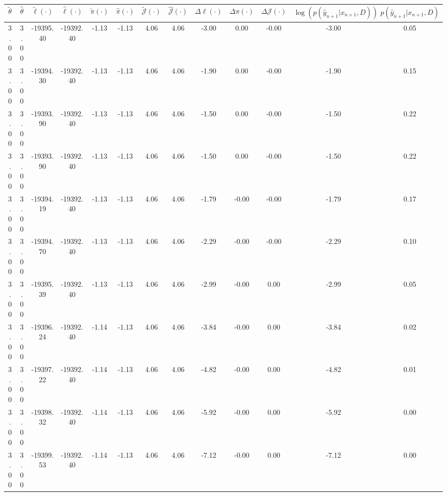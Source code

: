 \begin{table}[htbp]
        \centering
        \tiny
        \begin{adjustbox}{angle=90}
            \begin{tabular}{|c|c|c|c|c|c|c|c|c|c|c|c|c|}
                \hline
                 $\tilde{\theta}$ & $\hat{\theta}$ & $\tilde{\ell}(\cdot)$ & $\hat{\ell}(\cdot)$ & $\tilde{\pi}(\cdot)$ & $\hat{\pi}(\cdot)$ & $\tilde{\mathcal{J}}(\cdot)$ & $\hat{\mathcal{J}}(\cdot)$ & $\Delta \ell(\cdot)$ & $\Delta \pi(\cdot)$ & $\Delta \mathcal{J}(\cdot)$ & $\log(p(\hat{y}_{n+1}|x_{n+1}, D))$ & $p(\hat{y}_{n+1}|x_{n+1}, D)$ \\
                \hline
                 3.00 & 3.00 & -19395.40 & -19392.40 & -1.13 & -1.13 & 4.06 & 4.06 & -3.00 & 0.00 & -0.00 & -3.00 & 0.05\\ \hline
 3.00 & 3.00 & -19394.30 & -19392.40 & -1.13 & -1.13 & 4.06 & 4.06 & -1.90 & 0.00 & -0.00 & -1.90 & 0.15\\ \hline
 3.00 & 3.00 & -19393.90 & -19392.40 & -1.13 & -1.13 & 4.06 & 4.06 & -1.50 & 0.00 & -0.00 & -1.50 & 0.22\\ \hline
 3.00 & 3.00 & -19393.90 & -19392.40 & -1.13 & -1.13 & 4.06 & 4.06 & -1.50 & 0.00 & -0.00 & -1.50 & 0.22\\ \hline
 3.00 & 3.00 & -19394.19 & -19392.40 & -1.13 & -1.13 & 4.06 & 4.06 & -1.79 & -0.00 & -0.00 & -1.79 & 0.17\\ \hline
 3.00 & 3.00 & -19394.70 & -19392.40 & -1.13 & -1.13 & 4.06 & 4.06 & -2.29 & -0.00 & -0.00 & -2.29 & 0.10\\ \hline
 3.00 & 3.00 & -19395.39 & -19392.40 & -1.13 & -1.13 & 4.06 & 4.06 & -2.99 & -0.00 & 0.00 & -2.99 & 0.05\\ \hline
 3.00 & 3.00 & -19396.24 & -19392.40 & -1.14 & -1.13 & 4.06 & 4.06 & -3.84 & -0.00 & 0.00 & -3.84 & 0.02\\ \hline
 3.00 & 3.00 & -19397.22 & -19392.40 & -1.14 & -1.13 & 4.06 & 4.06 & -4.82 & -0.00 & 0.00 & -4.82 & 0.01\\ \hline
 3.00 & 3.00 & -19398.32 & -19392.40 & -1.14 & -1.13 & 4.06 & 4.06 & -5.92 & -0.00 & 0.00 & -5.92 & 0.00\\ \hline
 3.00 & 3.00 & -19399.53 & -19392.40 & -1.14 & -1.13 & 4.06 & 4.06 & -7.12 & -0.00 & 0.00 & -7.12 & 0.00\\ \hline
            \end{tabular}
        \end{adjustbox}
        \caption{}
        \label{}
    \end{table}
    
